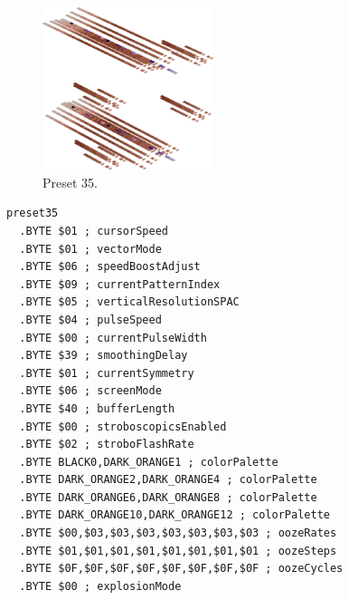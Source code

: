 \vspace*{-0.5cm}
\begin{minipage}[b]{0.48\linewidth}
\begin{figure}[H]                                                          
  \centering                                                             
  \begin{adjustbox}{width=5cm,center}                                   
  \includegraphics[width=5cm]{src/colorspace_presets/preset35-45.png}%
  \end{adjustbox}                                                        
\caption*{Preset 35.}                                           
\end{figure}                                                               
\end{minipage}
\hspace{0.1cm}
\begin{minipage}[b]{0.48\linewidth}                                                                         
\begin{lstlisting}[basicstyle=\ttfamily\tiny]
preset35
  .BYTE $01 ; cursorSpeed
  .BYTE $01 ; vectorMode
  .BYTE $06 ; speedBoostAdjust
  .BYTE $09 ; currentPatternIndex
  .BYTE $05 ; verticalResolutionSPAC
  .BYTE $04 ; pulseSpeed
  .BYTE $00 ; currentPulseWidth
  .BYTE $39 ; smoothingDelay
  .BYTE $01 ; currentSymmetry
  .BYTE $06 ; screenMode
  .BYTE $40 ; bufferLength
  .BYTE $00 ; stroboscopicsEnabled
  .BYTE $02 ; stroboFlashRate
  .BYTE BLACK0,DARK_ORANGE1 ; colorPalette
  .BYTE DARK_ORANGE2,DARK_ORANGE4 ; colorPalette
  .BYTE DARK_ORANGE6,DARK_ORANGE8 ; colorPalette
  .BYTE DARK_ORANGE10,DARK_ORANGE12 ; colorPalette
  .BYTE $00,$03,$03,$03,$03,$03,$03,$03 ; oozeRates
  .BYTE $01,$01,$01,$01,$01,$01,$01,$01 ; oozeSteps
  .BYTE $0F,$0F,$0F,$0F,$0F,$0F,$0F,$0F ; oozeCycles
  .BYTE $00 ; explosionMode
\end{lstlisting}
\end{minipage}


